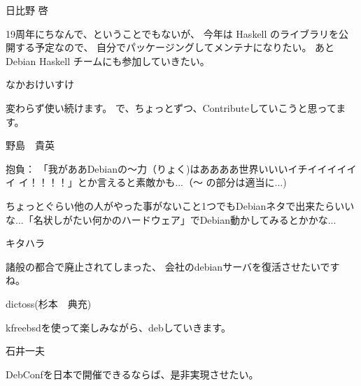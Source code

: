 %

\begin{prework}{ 日比野 啓 }

19周年にちなんで、ということでもないが、
今年は Haskell のライブラリを公開する予定なので、
自分でパッケージングしてメンテナになりたい。
あと Debian Haskell チームにも参加していきたい。

\end{prework}

\begin{prework}{ なかおけいすけ }

変わらず使い続けます。
で、ちょっとずつ、Contributeしていこうと思ってます。
\end{prework}

\begin{prework}{ 野島　貴英 }

抱負：
「我がああDebianの〜力（りょく)はああああ世界いいいイチイイイイイイ
 イ！！！！」とか言えると素敵かも...（〜 の部分は適当に...)
 
ちょっとぐらい他の人がやった事がないこと1つでもDebianネタで出来たらいいな...「名状しがたい何かのハードウェア」でDebian動かしてみるとかかな...

\end{prework}

\begin{prework}{ キタハラ }

諸般の都合で廃止されてしまった、
会社のdebianサーバを復活させたいですね。

\end{prework}

\begin{prework}{ dictoss(杉本　典充) }

kfreebsdを使って楽しみながら、debしていきます。
\end{prework}

\begin{prework}{ 石井一夫 }

DebConfを日本で開催できるならば、是非実現させたい。
\end{prework}
